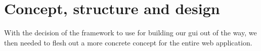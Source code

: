 \documentclass[\relativeRoot/main.tex]{subfiles}
\begin{document}
\section{Concept, structure and design}
\label{sec:lyprox:concept}

With the decision of the framework to use for building our \gls{gui} out of the way, we then needed to flesh out a more concrete concept for the entire web application. 
\end{document}
